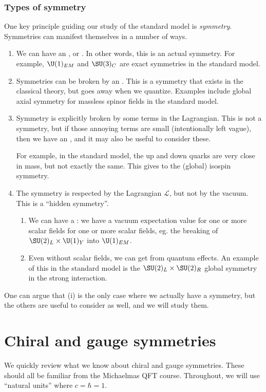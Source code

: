 \documentclass[a4paper]{article}
\begin{document}
\subsubsection*{Types of symmetry}
One key principle guiding our study of the standard model is \emph{symmetry}. Symmetries can manifest themselves in a number of ways.
\begin{enumerate}
  \item We can have an , or . In other words, this is an actual symmetry. For example, $\U(1)_{EM}$ and $\SU(3)_C$ are exact symmetries in the standard model.
  \item Symmetries can be broken by an . This is a symmetry that exists in the classical theory, but goes away when we quantize. Examples include global axial symmetry for massless spinor fields in the standard model.
  \item Symmetry is explicitly broken by some terms in the Lagrangian. This is not a symmetry, but if those annoying terms are small (intentionally left vague), then we have an , and it may also be useful to consider these.

    For example, in the standard model, the up and down quarks are very close in mass, but not exactly the same. This gives to the (global) isospin symmetry.
  \item The symmetry is respected by the Lagrangian $\mathcal{L}$, but not by the vacuum. This is a ``hidden symmetry''.
    \begin{enumerate}
      \item We can have a : we have a vacuum expectation value for one or more scalar fields for one or more scalar fields, eg. the breaking of $\SU(2)_L \times \U(1)_Y$ into $\U(1)_{EM}$.
      \item Even without scalar fields, we can get  from quantum effects. An example of this in the standard model is the $\SU(2)_L \times \SU(2)_R$ global symmetry in the strong interaction.
    \end{enumerate}
\end{enumerate}
One can argue that (i) is the only case where we actually have a symmetry, but the others are useful to consider as well, and we will study them.

\section{Chiral and gauge symmetries}
We quickly review what we know about chiral and gauge symmetries. These should all be familiar from the Michaelmas QFT course. Throughout, we will use ``natural units'' where $c = \hbar = 1$.
\end{document}
